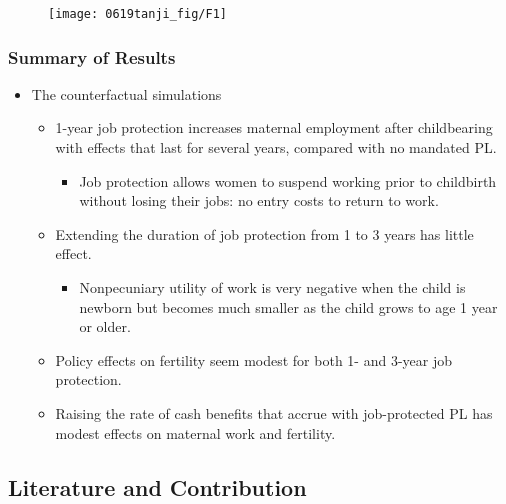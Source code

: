 \documentclass[dvipdfmx,11pt]{beamer}
\begin{document}
\begin{frame}\frametitle{}
  \begin{figure}
    \centering
    \texttt{[image: 0619tanji\_fig/F1]}
    \label{F1}
  \end{figure}
\end{frame}

\begin{frame}\frametitle{Summary of Results}
  \begin{itemize}
    \item The counterfactual simulations
    \begin{itemize}
      \item 1-year job protection increases maternal employment after childbearing with effects that last for several years, compared with no mandated PL.
      \begin{itemize}
        \item Job protection allows women to suspend working prior to childbirth without losing their jobs: no entry costs to return to work.
      \end{itemize}
      \item Extending the duration of job protection from 1 to 3 years has little effect.
      \begin{itemize}
        \item Nonpecuniary utility of work is very negative when the child is newborn but becomes much smaller as the child grows to age 1 year or older.
      \end{itemize}
      \item Policy effects on fertility seem modest for both 1- and 3-year job protection.
      \item Raising the rate of cash benefits that accrue with job-protected PL has modest effects on maternal work and fertility.
    \end{itemize}
  \end{itemize}
\end{frame}

\subsection{Literature and Contribution}
\end{document}
